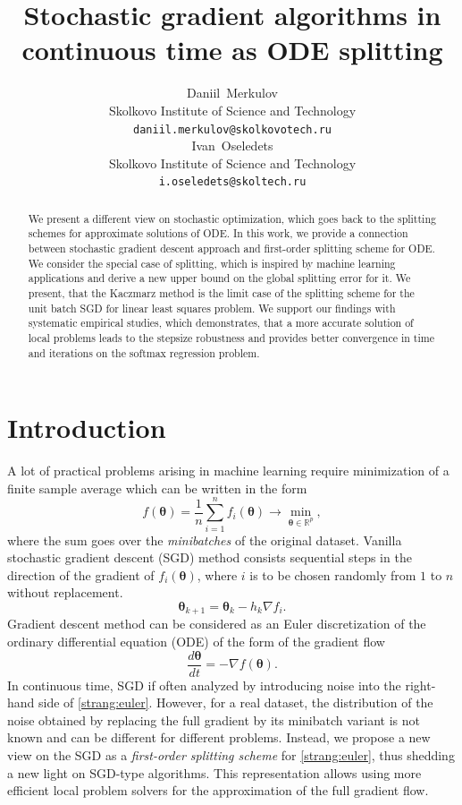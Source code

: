 \documentclass{article}
\title{Stochastic gradient algorithms in continuous time as ODE splitting}
\author{%
  Daniil~Merkulov \\
  Skolkovo Institute of Science and Technology\\
  \texttt{daniil.merkulov@skolkovotech.ru} \\
  \And
  Ivan~Oseledets \\
  Skolkovo Institute of Science and Technology\\
  \texttt{i.oseledets@skoltech.ru} \\
}
\newcommand{\vect}[1]{\boldsymbol{\mathbf{#1}}}
\begin{document}
\maketitle

\begin{abstract}
  We present a different view on stochastic optimization, which goes back to the splitting schemes for approximate solutions of ODE. In this work, we provide a connection between stochastic gradient descent approach and first-order splitting scheme for ODE. We consider the special case of splitting, which is inspired by machine learning applications and derive a new upper bound on the global splitting error for it. We present, that the Kaczmarz method is the limit case of the splitting scheme for the unit batch SGD for linear least squares problem. We support our findings with systematic empirical studies, which demonstrates, that a more accurate solution of local problems leads to the stepsize robustness and provides better convergence in time and iterations on the softmax regression problem.
\end{abstract}

\section{Introduction}
A lot of practical problems arising in machine learning require minimization of a finite sample average which can be written in the form
\begin{equation}\label{strang:finitesum}
    f(\vect{\vect{\theta}}) = \frac{1}{n} \sum_{i=1}^n f_i(\vect{\vect{\theta}}) \rightarrow \min_{\vect{\vect{\theta}} \in \mathbb{R}^p},
\end{equation}
where the sum goes over the \emph{minibatches} of the original dataset. Vanilla stochastic gradient descent
(SGD) method \citet{robbins1951stochastic} consists sequential steps in the direction of the gradient of $f_i(\vect{\theta})$, where $i$ is to be chosen randomly from $1$ to $n$ without replacement.
\begin{equation}
\vect{\theta}_{k+1} = \vect{\theta}_{k} - h_{k} \nabla f_i.
\end{equation}
Gradient descent method \citet{cauchy1847methode} can be considered as an Euler discretization of the ordinary
differential equation (ODE) of the form of the gradient flow
\begin{equation}\label{strang:euler}
    \frac{d \vect{\theta}}{d t} = -\nabla f(\vect{\theta}).
\end{equation}
In continuous time, SGD if often analyzed by introducing noise into the right-hand side of \eqref{strang:euler}. However, for a real dataset, the distribution of the noise obtained by replacing the full gradient by its minibatch variant is not known and can be different for different problems. Instead, we propose a new view on the SGD as a \emph{first-order splitting scheme} for \eqref{strang:euler}, thus shedding a new light on SGD-type algorithms. This representation allows using more efficient local problem solvers for the approximation of the full gradient flow.
\end{document}
